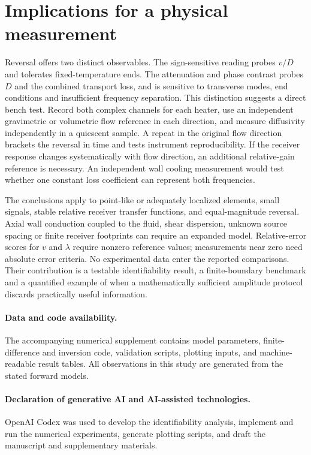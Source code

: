 \documentclass[11pt]{article}
\begin{document}
\section{Implications for a physical measurement}
Reversal offers two distinct observables. The sign-sensitive reading probes $v/D$ and tolerates fixed-temperature ends. The attenuation and phase contrast probes $D$ and the combined transport loss, and is sensitive to transverse modes, end conditions and insufficient frequency separation. This distinction suggests a direct bench test. Record both complex channels for each heater, use an independent gravimetric or volumetric flow reference in each direction, and measure diffusivity independently in a quiescent sample. A repeat in the original flow direction brackets the reversal in time and tests instrument reproducibility. If the receiver response changes systematically with flow direction, an additional relative-gain reference is necessary. An independent wall cooling measurement would test whether one constant loss coefficient can represent both frequencies.

The conclusions apply to point-like or adequately localized elements, small signals, stable relative receiver transfer functions, and equal-magnitude reversal. Axial wall conduction coupled to the fluid, shear dispersion, unknown source spacing or finite receiver footprints can require an expanded model. Relative-error scores for $v$ and $\lambda$ require nonzero reference values; measurements near zero need absolute error criteria. No experimental data enter the reported comparisons. Their contribution is a testable identifiability result, a finite-boundary benchmark and a quantified example of when a mathematically sufficient amplitude protocol discards practically useful information.

\paragraph{Data and code availability.} The accompanying numerical supplement contains model parameters, finite-difference and inversion code, validation scripts, plotting inputs, and machine-readable result tables. All observations in this study are generated from the stated forward models.
\paragraph{Declaration of generative AI and AI-assisted technologies.} OpenAI Codex was used to develop the identifiability analysis, implement and run the numerical experiments, generate plotting scripts, and draft the manuscript and supplementary materials.
\end{document}
